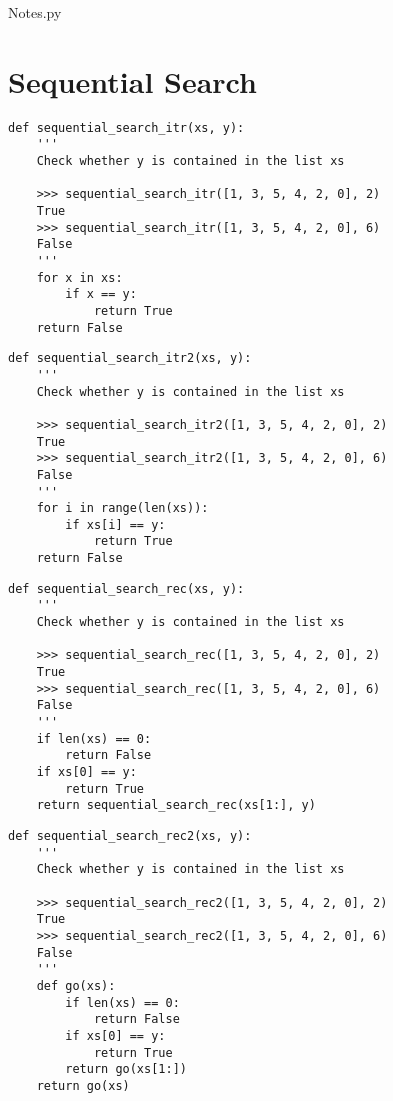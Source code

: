 \documentclass[10pt]{article}
\theoremstyle{definition}
\begin{document}
\begin{center}
    {
\Large
    Notes.py
}

    \vspace{0.1in}
\end{center}

\section{Sequential Search}

\filbreak
\begin{lstlisting}
def sequential_search_itr(xs, y):
    '''
    Check whether y is contained in the list xs

    >>> sequential_search_itr([1, 3, 5, 4, 2, 0], 2)
    True
    >>> sequential_search_itr([1, 3, 5, 4, 2, 0], 6)
    False
    '''
    for x in xs:
        if x == y:
            return True
    return False
\end{lstlisting}

\filbreak
\begin{lstlisting}
def sequential_search_itr2(xs, y):
    '''
    Check whether y is contained in the list xs

    >>> sequential_search_itr2([1, 3, 5, 4, 2, 0], 2)
    True
    >>> sequential_search_itr2([1, 3, 5, 4, 2, 0], 6)
    False
    '''
    for i in range(len(xs)):
        if xs[i] == y:
            return True
    return False
\end{lstlisting}

\filbreak
\begin{lstlisting}
def sequential_search_rec(xs, y):
    '''
    Check whether y is contained in the list xs

    >>> sequential_search_rec([1, 3, 5, 4, 2, 0], 2)
    True
    >>> sequential_search_rec([1, 3, 5, 4, 2, 0], 6)
    False
    '''
    if len(xs) == 0:
        return False
    if xs[0] == y:
        return True
    return sequential_search_rec(xs[1:], y)
\end{lstlisting}

\filbreak
\begin{lstlisting}
def sequential_search_rec2(xs, y):
    '''
    Check whether y is contained in the list xs

    >>> sequential_search_rec2([1, 3, 5, 4, 2, 0], 2)
    True
    >>> sequential_search_rec2([1, 3, 5, 4, 2, 0], 6)
    False
    '''
    def go(xs):
        if len(xs) == 0:
            return False
        if xs[0] == y:
            return True
        return go(xs[1:])
    return go(xs)
\end{lstlisting}
\end{document}
